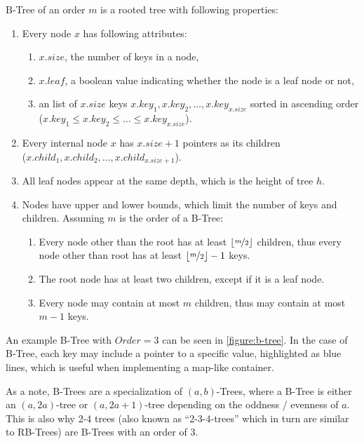 \begin{definition}\label{def:btree}
  B-Tree of an order $m$ is a rooted tree with following properties:
  \begin{enumerate}
    \item Every node $x$ has following attributes:
          \begin{enumerate}
            \item $x.\mathit{size}$, the number of keys in a node,
            \item $x.\mathit{leaf}$, a boolean value indicating whether the node is a leaf node or not,
            \item an list of $x.\mathit{size}$ keys $x.\mathit{key}_1, x.\mathit{key}_2, \dots, x.\mathit{key}_{x.size}$ sorted in ascending order ($x.\mathit{key}_1 \le x.\mathit{key}_2 \le \dots \le x.\mathit{key}_{x.\mathit{size}}$).
          \end{enumerate}
    \item Every internal node $x$ has $x.size + 1$ pointers as its children \\($x.child_1, x.child_2, \dots, x.child_{x.size + 1}$).
    \item All leaf nodes appear at the same depth, which is the height of tree $h$.
    \item Nodes have upper and lower bounds, which limit the number of keys and children. Assuming $m$ is the order of a B-Tree:
          \begin{enumerate}
            \item Every node other than the root has at least $\lfloor\nicefrac{m}{2}\rfloor$ children, thus every node other than root has at least $\lfloor\nicefrac{m}{2}\rfloor - 1$ keys.
            \item The root node has at least two children, except if it is a leaf node.
            \item Every node may contain at most $m$ children, thus may contain at most $m - 1$ keys.
          \end{enumerate}
  \end{enumerate}
\end{definition}

An example B-Tree with $\mathit{Order} = 3$ can be seen in \cref{figure:b-tree}. In the case of B-Tree, each key may include a pointer to a specific value, highlighted as blue lines, which is useful when implementing a map-like container.

As a note, B-Trees are a specialization of $(a,b)$-Trees, where a B-Tree is either an $(a, 2a)$-tree or $(a, 2a + 1)$-tree depending on the oddness / evenness of $a$. This is also why 2-4 trees (also known as \enquote{2-3-4-trees} which in turn are similar to RB-Trees) are B-Trees with an order of 3.

